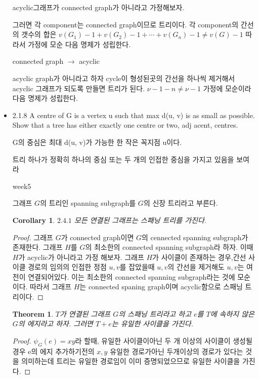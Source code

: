 \documentclass{oblivoir}
\newtheorem{theorem}{Theorem}[section]
\newtheorem{corollary}{Corollary}[theorem]
\begin{document}
\begin{itemize}
    acyclic그래프가 connected graph가 아니라고 가정해보자.

    그러면 각 component는 connected graph이므로 트리이다.
    각 component의 간선의 갯수의 합은 $v(G_1)-1 + v(G_2)-1 + \cdots + v(G_n)-1 \neq v(G)-1 $
    따라서 가정에 모순 다음 명제가 성립한다.

    connected graph $\rightarrow$ acyclic

    acyclic graph가 아니라고 하자 cycle이 형성된곳의 간선을 하나씩 제거해서 acyclic 그래프가 되도록 만들면 트리가 된다.
    $\nu-1-n \neq \nu -1 $ 가정에 모순이라 다음 명제가 성립한다.

    \item  2.1.8
    A centre of G is a vertex u such that max d(u, v) is as small as possible.
    Show that a tree has either exactly one centre or two,
    adj acent, centres.


    G의 중심은 최대 d(u, v)가 가능한 한 작은 꼭지점 u이다.

    트리 하나가 정확히 하나의 중심 또는 두 개의 인접한 중심을 가지고 있음을 보여라

    week5
  
    \begin{dfn}
        그래프 $G$의 트리인 spanning subgraph를 $G$의 신장 트리라고 부른다.
    \end{dfn}

    \begin{corollary}
        $2.4.1$ 모든 연결된 그래프는 스패닝 트리를 가진다.
    \end{corollary}

    \begin{proof}
        그래프 $G$가 connected graph이면 $G$의 cennected spanning subgraph가 존재한다.
        그래프 $H$를 $G$의 최소한의 connected spanning subgraph라 하자.
        이때 $H$가 acyclic가 아니라고 가정 해보자.
        그래프 $H$가 사이클이 존재하는 경우,간선 사이클 경로의 임의의 인접한 정점 $u, v$를 잡았을때 $u, v$의 간선을 제거해도 $u, v$는 여전이 연결되어있다. 이는 최소한의 connected spanning subgraph라는 것에 모순이다. 
        따라서 그래프 $H$는 connected spaning graph이며 acyclic함으로 스패닝 트리이다.
    \end{proof}

    \begin{theorem}
        $T$가 연결된 그래프 $G$의 스패닝 트리라고 하고 $e$를 $T$에 속하지 않은 $G$의 에지라고 하자. 그러면 $T + e$는 유일한 사이클을 가진다.
    \end{theorem}
    \begin{proof}
        $\psi_G(e) = xy$라 할때, 유일한 사이클이아닌 두 개 이상의 사이클이 생성될 경우  e의 에지 추가하기전의 $x, y$ 유일한 경로가아닌 두개이상의 경로가 있다는 것을 의미하는데 트리는 유일한 경로임이 이미 증명되었으므로 유일한 사이클을 가진다.
    \end{proof}


\end{itemize}
\end{document}
